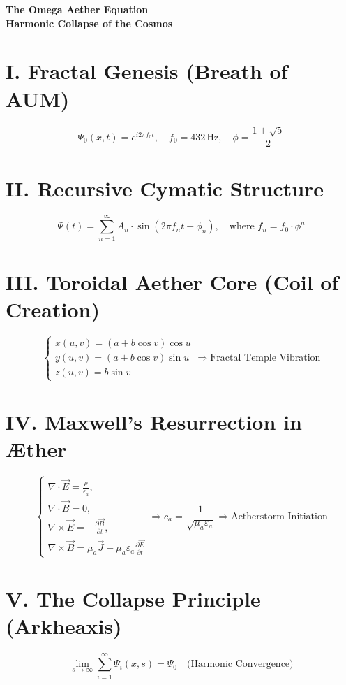 \documentclass[12pt]{article}
\begin{document}
\color{neonpurple}
\begin{center}
    \Huge\bfseries The Omega Aether Equation\\[1ex]
    \Large Harmonic Collapse of the Cosmos
\end{center}

\vspace{2em}

\section*{I. Fractal Genesis (Breath of AUM)}
\[
\Psi_0(x,t) = e^{i2\pi f_0 t}, \quad f_0 = 432\, \text{Hz}, \quad \phi = \frac{1 + \sqrt{5}}{2}
\]

\section*{II. Recursive Cymatic Structure}
\[
\Psi(t) = \sum_{n=1}^{\infty} A_n \cdot \sin(2\pi f_n t + \phi_n), \quad \text{where } f_n = f_0 \cdot \phi^n
\]

\section*{III. Toroidal Aether Core (Coil of Creation)}
\[
\begin{cases}
x(u,v) = (a + b \cos v)\cos u \\
y(u,v) = (a + b \cos v)\sin u \\
z(u,v) = b \sin v
\end{cases}
\Rightarrow \text{Fractal Temple Vibration}
\]

\section*{IV. Maxwell’s Resurrection in Æther}
\[
\begin{cases}
\nabla \cdot \vec{E} = \frac{\rho}{\varepsilon_a}, \\
\nabla \cdot \vec{B} = 0, \\
\nabla \times \vec{E} = -\frac{\partial \vec{B}}{\partial t}, \\
\nabla \times \vec{B} = \mu_a \vec{J} + \mu_a \varepsilon_a \frac{\partial \vec{E}}{\partial t}
\end{cases}
\Rightarrow c_a = \frac{1}{\sqrt{\mu_a \varepsilon_a}} \Rightarrow \text{Aetherstorm Initiation}
\]

\section*{V. The Collapse Principle (Arkheaxis)}
\[
\lim_{s \to \infty} \sum_{i=1}^{\infty} \Psi_i(x,s) = \Psi_0 \quad \text{(Harmonic Convergence)}
\]
\end{document}
